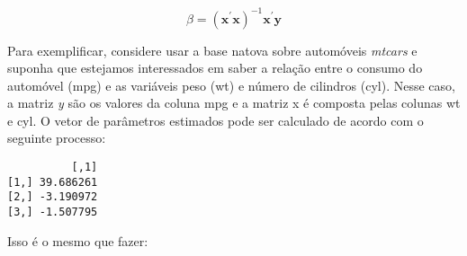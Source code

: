 \documentclass[
  letterpaper,
  DIV=11,
  numbers=noendperiod]{scrreprt}
\newenvironment{Shaded}{\begin{snugshade}}{\end{snugshade}}
\newcommand{\AttributeTok}[1]{\textcolor[rgb]{0.40,0.45,0.13}{#1}}
\newcommand{\CommentTok}[1]{\textcolor[rgb]{0.37,0.37,0.37}{#1}}
\newcommand{\DecValTok}[1]{\textcolor[rgb]{0.68,0.00,0.00}{#1}}
\newcommand{\FunctionTok}[1]{\textcolor[rgb]{0.28,0.35,0.67}{#1}}
\newcommand{\NormalTok}[1]{\textcolor[rgb]{0.00,0.23,0.31}{#1}}
\newcommand{\OtherTok}[1]{\textcolor[rgb]{0.00,0.23,0.31}{#1}}
\newcommand{\SpecialCharTok}[1]{\textcolor[rgb]{0.37,0.37,0.37}{#1}}
\begin{document}
\[ \beta = (\textbf{x}^\prime \textbf{x})^{-1}\textbf{x}^\prime \textbf{y} \]

Para exemplificar, considere usar a base natova sobre automóveis
\emph{mtcars} e suponha que estejamos interessados em saber a relação
entre o consumo do automóvel (mpg) e as variáveis peso (wt) e número de
cilindros (cyl). Nesse caso, a matriz \emph{y} são os valores da coluna
mpg e a matriz x é composta pelas colunas wt e cyl. O vetor de
parâmetros estimados pode ser calculado de acordo com o seguinte
processo:

\begin{Shaded}
\end{Shaded}

\begin{verbatim}
          [,1]
[1,] 39.686261
[2,] -3.190972
[3,] -1.507795
\end{verbatim}

Isso é o mesmo que fazer:

\begin{Shaded}
\end{Shaded}
\end{document}
